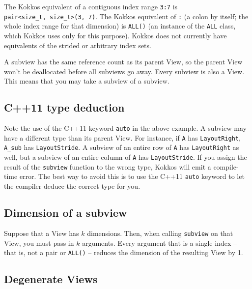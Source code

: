 The Kokkos equivalent of a contiguous index range \texttt{3:7} is \\
\lstinline!pair<size_t, size_t>(3, 7)!.  The Kokkos equivalent of
\texttt{:} (a colon by itself; the whole index range for that
dimension) is \texttt{ALL()} (an instance of the \texttt{ALL} class,
which Kokkos uses only for this purpose).  Kokkos does not currently
have equivalents of the strided or arbitrary index sets.

A subview has the same reference count as its parent View, so the
parent View won't be deallocated before all subviews go away.  Every
subview is also a View.  This means that you may take a subview of a
subview.

\subsection{C++11 type deduction}\label{SS:Subviews:How:auto}

Note the use of the C++11 keyword \texttt{auto} in the above example.
A subview may have a different type than its parent View.  For
instance, if \lstinline!A! has \lstinline!LayoutRight!,
\lstinline!A_sub!  has \lstinline!LayoutStride!.  A subview of an
entire row of \lstinline!A! has \lstinline!LayoutRight! as well, but a
subview of an entire column of \lstinline!A! has
\lstinline!LayoutStride!.  If you assign the result of the
\texttt{subview} function to the wrong type, Kokkos will emit a
compile-time error.  The best way to avoid this is to use the C++11
\texttt{auto} keyword to let the compiler deduce the correct type for
you.

\subsection{Dimension of a subview}\label{SS:Subviews:How:dim}

Suppose that a View has $k$ dimensions.  Then, when calling
\texttt{subview} on that View, you must pass in $k$ arguments.  Every
argument that is a single index -- that is, not a pair or
\lstinline!ALL()! -- reduces the dimension of the resulting View by 1.

\subsection{Degenerate Views}\label{SS:Subviews:How:degen}

